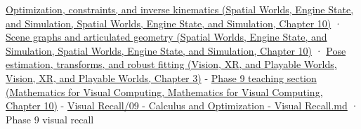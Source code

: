 \href{../05-Spatial-Worlds-Engine-State-and-Simulation/main.pdf\#nameddest=04-visual-computing-ii-ch029-optimization-constraints-and-inverse-kinematics}{Optimization, constraints, and inverse kinematics (Spatial Worlds, Engine State, and Simulation, Spatial Worlds, Engine State, and Simulation, Chapter 10)} · \href{../05-Spatial-Worlds-Engine-State-and-Simulation/main.pdf\#nameddest=04-visual-computing-ii-ch029-scene-graphs-and-articulated-geometry}{Scene graphs and articulated geometry (Spatial Worlds, Engine State, and Simulation, Spatial Worlds, Engine State, and Simulation, Chapter 10)} · \href{../07-Vision-XR-and-Playable-Worlds/main.pdf\#nameddest=04-visual-computing-ii-ch032-pose-estimation-transforms-and-robust-fitting}{Pose estimation, transforms, and robust fitting (Vision, XR, and Playable Worlds, Vision, XR, and Playable Worlds, Chapter 3)} - \href{../02-Mathematics-for-Visual-Computing/main.pdf\#nameddest=02-foundations-ii-ch026-optimization-and-inverse-problems}{Phase 9 teaching section (Mathematics for Visual Computing, Mathematics for Visual Computing, Chapter 10)} - \hyperref[appendix-adf48f5dc5c1]{Visual Recall/09 - Calculus and Optimization - Visual Recall.md} · Phase 9 visual recall

